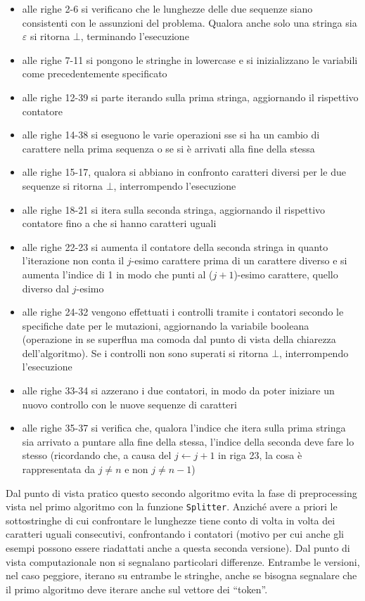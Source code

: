 \documentclass[a4paper,12pt, oneside]{book}
\begin{document}
\begin{itemize}
  \item alle righe 2-6 si verificano che le lunghezze delle due sequenze siano
  consistenti con le assunzioni del problema. Qualora anche solo una stringa sia
  $\varepsilon$ si ritorna $\bot$, terminando l'esecuzione
  \item alle righe 7-11 si pongono le stringhe in lowercase e si inizializzano
  le variabili come precedentemente specificato
  \item alle righe 12-39 si parte iterando sulla prima stringa, aggiornando il
  rispettivo contatore
  \item alle righe 14-38 si eseguono le varie operazioni sse si
  ha un cambio di carattere nella prima sequenza o se si è arrivati alla fine
  della stessa
  \item alle righe 15-17, qualora si abbiano in confronto caratteri diversi per
  le due sequenze si ritorna $\bot$, interrompendo l'esecuzione
  \item alle righe 18-21 si itera sulla seconda stringa, aggiornando il
  rispettivo contatore fino a che si hanno caratteri uguali
  \item alle righe 22-23 si aumenta il contatore della seconda stringa in quanto
  l'iterazione non conta il $j$-esimo carattere prima di un carattere diverso e
  si aumenta l'indice di 1 in modo che punti al ($j+1$)-esimo carattere, quello
  diverso dal $j$-esimo 
  \item alle righe 24-32 vengono effettuati i controlli tramite i contatori
  secondo le specifiche date per le mutazioni, aggiornando la variabile
  booleana (operazione in se superflua ma comoda dal punto di vista della
  chiarezza dell'algoritmo). Se i controlli non sono superati si ritorna $\bot$,
  interrompendo l'esecuzione
  \item alle righe 33-34 si azzerano i due contatori, in modo da poter iniziare
  un nuovo controllo con le nuove sequenze di caratteri
  \item alle righe 35-37 si verifica che, qualora l'indice che itera sulla prima
  stringa sia arrivato a puntare alla fine della stessa, l'indice della seconda
  deve fare lo stesso (ricordando che, a causa del $j\gets j+1$ in riga 23, la
  cosa è rappresentata da $j\neq n$ e non $j\neq n-1$)
\end{itemize}
Dal punto di vista pratico questo secondo algoritmo evita la fase di
preprocessing vista nel primo algoritmo con la funzione
\texttt{Splitter}. Anziché avere a priori le sottostringhe di cui confrontare le
lunghezze tiene conto di volta in volta dei caratteri uguali consecutivi,
confrontando i contatori (motivo per cui anche gli esempi possono essere
riadattati anche a questa seconda versione). Dal
punto di vista computazionale non si segnalano particolari differenze. Entrambe
le versioni, nel caso peggiore, iterano su entrambe le stringhe, anche se
bisogna segnalare che il primo algoritmo deve iterare anche sul vettore dei
``token''. 
\end{document}
